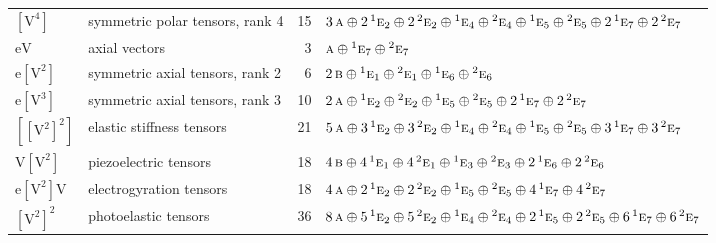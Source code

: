 \documentclass[10pt,a4paper]{article}
\numberwithin{equation}{section}
\newcommand{\irr}[1]{\text{\normalfont\scshape #1}}
\newcommand{\conjpair}[1]{{}^{#1}}
\newcommand{\jahn}[1]{\mathrm{#1}}
\newlength{\fillwidth}\newlength{\cellwidth}\newlength{\colwidth}
\begin{document}
{\begin{longtable}{@{}llr>{\RaggedRight\arraybackslash}p{\fillwidth}@{}}
$\jahn{[V^{4}]}$ & symmetric polar tensors, rank 4 & 15 & $3\,\irr{a} \oplus\allowbreak 2\,\conjpair{1}\irr{e}_{2} \oplus\allowbreak 2\,\conjpair{2}\irr{e}_{2} \oplus\allowbreak \conjpair{1}\irr{e}_{4} \oplus\allowbreak \conjpair{2}\irr{e}_{4} \oplus\allowbreak \conjpair{1}\irr{e}_{5} \oplus\allowbreak \conjpair{2}\irr{e}_{5} \oplus\allowbreak 2\,\conjpair{1}\irr{e}_{7} \oplus\allowbreak 2\,\conjpair{2}\irr{e}_{7}$\\
$\jahn{eV}$ & axial vectors & 3 & $\irr{a} \oplus\allowbreak \conjpair{1}\irr{e}_{7} \oplus\allowbreak \conjpair{2}\irr{e}_{7}$\\
$\jahn{e[V^{2}]}$ & symmetric axial tensors, rank 2 & 6 & $2\,\irr{b} \oplus\allowbreak \conjpair{1}\irr{e}_{1} \oplus\allowbreak \conjpair{2}\irr{e}_{1} \oplus\allowbreak \conjpair{1}\irr{e}_{6} \oplus\allowbreak \conjpair{2}\irr{e}_{6}$\\
$\jahn{e[V^{3}]}$ & symmetric axial tensors, rank 3 & 10 & $2\,\irr{a} \oplus\allowbreak \conjpair{1}\irr{e}_{2} \oplus\allowbreak \conjpair{2}\irr{e}_{2} \oplus\allowbreak \conjpair{1}\irr{e}_{5} \oplus\allowbreak \conjpair{2}\irr{e}_{5} \oplus\allowbreak 2\,\conjpair{1}\irr{e}_{7} \oplus\allowbreak 2\,\conjpair{2}\irr{e}_{7}$\\
$\jahn{[[V^{2}]^{2}]}$ & elastic stiffness tensors & 21 & $5\,\irr{a} \oplus\allowbreak 3\,\conjpair{1}\irr{e}_{2} \oplus\allowbreak 3\,\conjpair{2}\irr{e}_{2} \oplus\allowbreak \conjpair{1}\irr{e}_{4} \oplus\allowbreak \conjpair{2}\irr{e}_{4} \oplus\allowbreak \conjpair{1}\irr{e}_{5} \oplus\allowbreak \conjpair{2}\irr{e}_{5} \oplus\allowbreak 3\,\conjpair{1}\irr{e}_{7} \oplus\allowbreak 3\,\conjpair{2}\irr{e}_{7}$\\
$\jahn{V[V^{2}]}$ & piezoelectric tensors & 18 & $4\,\irr{b} \oplus\allowbreak 4\,\conjpair{1}\irr{e}_{1} \oplus\allowbreak 4\,\conjpair{2}\irr{e}_{1} \oplus\allowbreak \conjpair{1}\irr{e}_{3} \oplus\allowbreak \conjpair{2}\irr{e}_{3} \oplus\allowbreak 2\,\conjpair{1}\irr{e}_{6} \oplus\allowbreak 2\,\conjpair{2}\irr{e}_{6}$\\
$\jahn{e[V^{2}]V}$ & electrogyration tensors & 18 & $4\,\irr{a} \oplus\allowbreak 2\,\conjpair{1}\irr{e}_{2} \oplus\allowbreak 2\,\conjpair{2}\irr{e}_{2} \oplus\allowbreak \conjpair{1}\irr{e}_{5} \oplus\allowbreak \conjpair{2}\irr{e}_{5} \oplus\allowbreak 4\,\conjpair{1}\irr{e}_{7} \oplus\allowbreak 4\,\conjpair{2}\irr{e}_{7}$\\
$\jahn{[V^{2}]^{2}}$ & photoelastic tensors & 36 & $8\,\irr{a} \oplus\allowbreak 5\,\conjpair{1}\irr{e}_{2} \oplus\allowbreak 5\,\conjpair{2}\irr{e}_{2} \oplus\allowbreak \conjpair{1}\irr{e}_{4} \oplus\allowbreak \conjpair{2}\irr{e}_{4} \oplus\allowbreak 2\,\conjpair{1}\irr{e}_{5} \oplus\allowbreak 2\,\conjpair{2}\irr{e}_{5} \oplus\allowbreak 6\,\conjpair{1}\irr{e}_{7} \oplus\allowbreak 6\,\conjpair{2}\irr{e}_{7}$\\

\end{longtable}}
\end{document}

